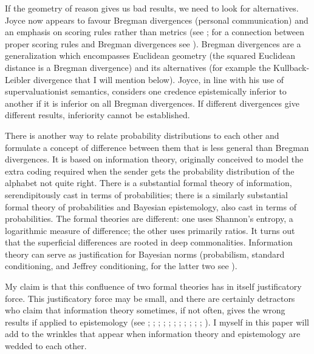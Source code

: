 \documentclass[smallextended]{svjour3}       %
\begin{document}
If the geometry of reason gives us bad results, we need to look for
alternatives. Joyce now appears to favour Bregman divergences
(personal communication) and an emphasis on scoring rules rather than
metrics (see ; for a connection between
proper scoring rules and Bregman divergences see
). Bregman divergences are a
generalization which encompasses Euclidean geometry (the squared
Euclidean distance is a Bregman divergence) and its alternatives (for
example the Kullback-Leibler divergence that I will mention below).
Joyce, in line with his use of supervaluationist semantics, considers
one credence epistemically inferior to another if it is inferior on
all Bregman divergences. If different divergences give different
results, inferiority cannot be established.

There is another way to relate probability distributions to each other
and formulate a concept of difference between them that is less
general than Bregman divergences. It is based on information theory,
originally conceived to model the extra coding required when the
sender gets the probability distribution of the alphabet not quite
right. There is a substantial formal theory of information,
serendipitously cast in terms of probabilities; there is a similarly
substantial formal theory of probabilities and Bayesian epistemology,
also cast in terms of probabilities. The formal theories are
different: one uses Shannon's entropy, a logarithmic measure of
difference; the other uses primarily ratios. It turns out that the
superficial differences are rooted in deep commonalities. Information
theory can serve as justification for Bayesian norms (probabilism,
standard conditioning, and Jeffrey conditioning, for the latter two
see ).

My claim is that this confluence of two formal theories has in itself
justificatory force. This justificatory force may be small, and there
are certainly detractors who claim that information theory sometimes,
if not often, gives the wrong results if applied to epistemology (see
; ;
; ;
; ;
; ;
; ;
; ). I
myself in this paper will add to the wrinkles that appear when
information theory and epistemology are wedded to each other. 
\end{document}
